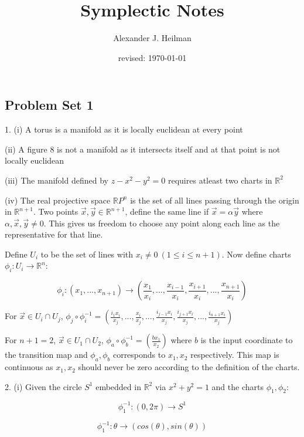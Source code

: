 \documentclass{article}
\title{Symplectic Notes}%
\author{Alexander J. Heilman}%
\date{revised: \today}%
\begin{document}
\maketitle


\pagebreak



\subsection{Problem Set 1}


1. (i) A torus is a manifold as it is locally euclidean at every point

(ii) A figure 8 is not a manifold as it intersects itself and at that point is not locally euclidean 

(iii) The manifold defined by $z-x^2-y^2=0$ requires atleast two charts in $\mathbb{R}^2$

(iv) The real projective space $\mathbb{R}P^n$ is the set of all lines passing through the origin in $\mathbb{R}^{n+1}$. Two points $\vec{x},\vec{y}\in\mathbb{R}^{n+1}$, define the same line if $\vec{x}=\alpha\vec{y}$ where $\alpha,\vec{x},\vec{y}\neq 0$. This gives us freedom to choose any point along each line as the representative for that line. 

Define $U_i$ to be the set of lines with $x_i\neq 0 \ (1\leq i\leq n+1)$. Now define charts $\phi_i:U_i\rightarrow \mathbb{R}^n$:

$$
\phi_i: (x_1,...,x_{n+1})\rightarrow \left(\frac{x_1}{x_i},...,\frac{x_{i-1}}{x_i},\frac{x_{i+1}}{x_i},...,\frac{x_{n+1}}{x_i}\right)
$$ 

For $\vec{x}\in U_i\cap U_j$, $\phi_j\circ\phi_i^{-1}=
\left(\frac{i_1 x_i}{x_j},...,\frac{x_i}{x_j} ,...,\frac{i_{j-1}x_i}{x_j},\frac{i_{j+1}x_i}{x_j},...,\frac{i_{n+1}x_i}{x_j}\right)
$

For $n+1=2$, $\vec{x}\in U_1\cap U_2$, $\phi_a\circ\phi_b^{-1}=
\left(\frac{bx_1}{x_2}\right) 
$ where $b$ is the input coordinate to the transition map and $\phi_a,\phi_b$ corresponds to $x_1,x_2$ respectively. This map is continuous as $x_1,x_2$ should never be zero according to the definition of the charts.

2. (i) Given the circle $S^1$ embedded in $\mathbb{R}^2$ via $x^2+y^2=1$ and the charts $\phi_1 ,\phi_2$:

$$
\phi_1^{-1}: (0,2\pi )\rightarrow S^1
$$

\vspace{-.3cm}

$$
\phi_1^{-1}: \theta \rightarrow (cos(\theta ),sin(\theta ))
$$
\end{document}
